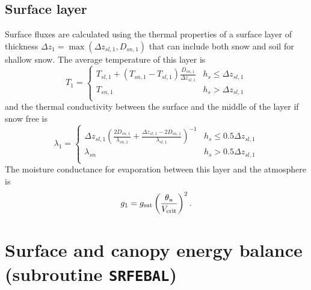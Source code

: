 \documentclass[fleqn]{article}
\begin{document}
\subsection{Surface layer}
Surface fluxes are calculated using the thermal properties of a surface layer of thickness $\Delta z_1 = \max(\Delta z_{sl,1},D_{sn,1})$ that can include both snow and soil for shallow snow. The average temperature of this layer is 
\begin{equation}
T_1 = 
\begin{cases}
      T_{sl,1} + (T_{sn,1} - T_{sl,1})\frac{D_{sn,1}}{\Delta z_{sl,1}}  & h_s \leq \Delta z_{sl,1} \\
      T_{sn,1}                                                & h_s > \Delta z_{sl,1} \\
\end{cases}
\end{equation}
and the thermal conductivity between the surface and the middle of the layer if snow free is
\begin{equation}
\lambda_1 = 
\begin{cases}
      \Delta z_{sl,1}\left(\frac{2D_{sn,1}}{\lambda_{sn,1}} + \frac{\Delta z_{sl,1} - 2D_{sn,1}}{\lambda_{sl,1}}\right)^{-1}  & h_s \leq 0.5\Delta z_{sl,1} \\
      \lambda_{sn}                                                & h_s > 0.5\Delta z_{sl,1} \\
\end{cases}
\end{equation}
The moisture conductance for evaporation between this layer and the atmosphere is
\begin{equation}
g_1 = g_{\rm sat}\left(\frac{\theta_u}{V_{\rm crit}}\right)^2.
\end{equation}

\section{Surface and canopy energy balance (subroutine {\tt SRFEBAL})}
\end{document}

